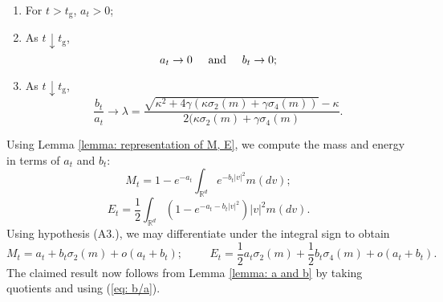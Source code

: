 \begin{lemma}
\begin{enumerate}[label=\roman{*}).]
    \item For $t>t_\mathrm{g}$, $a_t>0$;
    \item As $t\downarrow t_\mathrm{g}$, \begin{equation}
        a_t \rightarrow 0 \hspace{0.5cm} \text{and} \hspace{0.5cm} b_t\rightarrow 0;
    \end{equation}
    \item As $t\downarrow t_\mathrm{g}$, \begin{equation} \label{eq: b/a}
        \frac{b_t}{a_t}\rightarrow\lambda= \frac{\sqrt{\kappa^2+4\gamma(\kappa\sigma_2(m)+\gamma \sigma_4(m))}-\kappa}{2(\kappa\sigma_2(m)+\gamma\sigma_4(m)}.
    \end{equation}
\end{enumerate}  \end{lemma}  Using Lemma \ref{lemma: representation of M, E}, we compute the mass and energy in terms of $a_t$ and $b_t$:\begin{equation}
    M_t=1-e^{-a_t}\int_{\mathbb{R}^d} e^{-b_t|v|^2}m(dv);
\end{equation}\begin{equation}
    E_t=\frac{1}{2}\int_{\mathbb{R}^d}\left(1-e^{-a_t-b_t|v|^2}\right)|v|^2m(dv).
\end{equation} Using hypothesis ({A3}.), we may differentiate under the integral sign to obtain \begin{equation}
    M_t=a_t+b_t\sigma_2(m)+o(a_t+b_t); \hspace{1cm} E_t=\frac{1}{2}a_t\sigma_2(m)+\frac{1}{2}b_t\sigma_4(m)+o(a_t+b_t).
\end{equation} The claimed result now follows from Lemma \ref{lemma: a and b} by taking quotients and using (\ref{eq: b/a}). 

